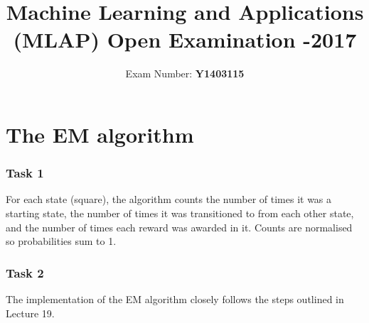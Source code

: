 \documentclass[a4paper, 11pt]{article}
\begin{document}
\title{\textbf {
Machine Learning and Applications (MLAP)
Open Examination -2017}}
\date{}
\author{Exam Number: \textbf{Y1403115}}
\maketitle


\part*{The EM algorithm}
\section{Task 1}
For each state (square), the algorithm counts the number of times it was a starting state, the number of times it was transitioned to from each other state, and the number of times each reward was awarded in it. Counts are normalised so probabilities sum to 1.    

\section{Task 2}
The implementation of the EM algorithm closely follows the steps outlined in Lecture 19. 
\end{document}
